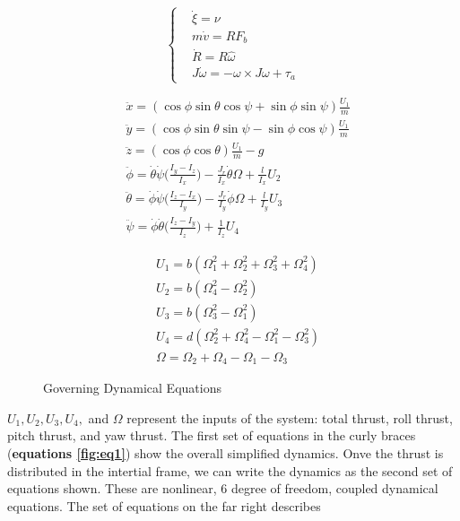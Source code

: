 \documentclass[conf]{new-aiaa}
\begin{document}
\begin{doublespace}
\begin{figure} 
	\begin{minipage}{0.25\textwidth}
		\begin{equation*}\label{fig:eq1}
			\begin{cases}
				& \dot{\xi} = \nu \\
				& m\dot{v} = RF_b \\
				& \dot{R} = R\hat{\omega} \\
				& J\dot{\omega} = -\omega \times J\omega + \tau_a
			\end{cases}
		\end{equation*}
	\end{minipage}
  \begin{minipage}{.35\textwidth}
    \begin{align*}
        &\ddot{x}=(\cos\phi\sin\theta\cos\psi + \sin\phi\sin\psi)\frac{U_1}{m} \\
		&\ddot{y}=(\cos\phi\sin\theta\sin\psi - \sin\phi\cos\psi)\frac{U_1}{m} \\
		&\ddot{z}=(\cos\phi\cos\theta)\frac{U_1}{m} -g \\
		&\ddot{\phi} = \dot{\theta}\dot{\psi}\Big(\frac{I_y - I_z}{I_x}\Big) - \frac{J_r}{I_x}\dot{\theta}\Omega + \frac{l}{I_x}U_2\\
		&\ddot{\theta} = \dot{\phi}\dot{\psi}\Big(\frac{I_z - I_x}{I_y}\Big) - \frac{J_r}{I_y}\dot{\phi}\Omega + \frac{l}{I_y}U_3 \\
		&\ddot{\psi} = \dot{\phi}\dot{\theta}\Big(\frac{I_z - I_y}{I_z}\Big) + \frac{1}{I_z}U_4
    \end{align*}
  \end{minipage}%
  \begin{minipage}{.3\textwidth}
  	\begin{align*}
  		&U_1 = b(\Omega_1^2 + \Omega_2^2 + \Omega_3^2 +\Omega_4^2)\\
  		&U_2 = b(\Omega_4^2 -\Omega_2^2) \\
  		&U_3 = b(\Omega_3^2 - \Omega_1^2) \\ 
  		&U_4 = d(\Omega_2^2 + \Omega_4^2 - \Omega_1^2 - \Omega_3^2) \\ 
  		&\Omega = \Omega_2 + \Omega_4 - \Omega_1 - \Omega_3
  	\end{align*}
  \end{minipage}
    	\caption{Governing Dynamical Equations}
\end{figure}

$U_1, U_2, U_3, U_4,$ and $\Omega$ represent the inputs of the system: total thrust, roll thrust, pitch thrust, and yaw thrust. The first set of equations in the curly braces (\textbf{equations \ref{fig:eq1}}) show the overall simplified dynamics. Onve the  thrust is distributed in the intertial frame, we can write the dynamics as the second set of equations shown. These are nonlinear, 6 degree of freedom, coupled dynamical equations. The set of equations on the far right describes






\end{doublespace}
\end{document}
